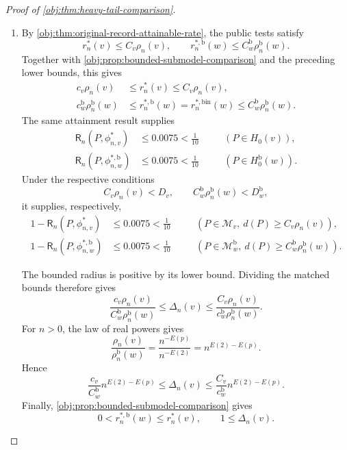 \documentclass[11pt]{article}
\begin{document}
\begin{proof}[Proof of \cref{obj:thm:heavy-tail-comparison}]
\begin{enumerate}
\item By \cref{obj:thm:original-record-attainable-rate}, the public tests satisfy
\[
r_n^*(v)\le C_v\rho_n(v),
\qquad
r_n^{*,\mathrm b}(w)\le C_w^{\mathrm b}\rho_n^{\mathrm b}(w).
\]
Together with \cref{obj:prop:bounded-submodel-comparison} and the preceding lower bounds, this gives
\[
\begin{aligned}
c_v\rho_n(v)
&\le r_n^*(v)\le C_v\rho_n(v),\\
c_w^{\mathrm b}\rho_n^{\mathrm b}(w)
&\le r_n^{*,\mathrm b}(w)
=r_n^{*,\mathrm{bin}}(w)
\le C_w^{\mathrm b}\rho_n^{\mathrm b}(w).
\end{aligned}
\]
The same attainment result supplies
\[
\begin{aligned}
\mathsf R_n(P,\phi^*_{n,v})&\le0.0075<\frac1{10}
&&\quad(P\in H_0(v)),\\
\mathsf R_n(P,\phi^{*,\mathrm b}_{n,w})&\le0.0075<\frac1{10}
&&\quad(P\in H_0^{\mathrm b}(w)).
\end{aligned}
\]
Under the respective conditions
\[
C_v\rho_n(v)<D_v,
\qquad
C_w^{\mathrm b}\rho_n^{\mathrm b}(w)<D_w^{\mathrm b},
\]
it supplies, respectively,
\[
\begin{aligned}
1-\mathsf R_n(P,\phi^*_{n,v})&\le0.0075<\frac1{10}
&&\quad(P\in\mathcal M_v,\ d(P)\ge C_v\rho_n(v)),\\
1-\mathsf R_n(P,\phi^{*,\mathrm b}_{n,w})&\le0.0075<\frac1{10}
&&\quad(P\in\mathcal M_w^{\mathrm b},\
d(P)\ge C_w^{\mathrm b}\rho_n^{\mathrm b}(w)).
\end{aligned}
\]

The bounded radius is positive by its lower bound. Dividing the matched bounds therefore gives
\[
\frac{c_v\rho_n(v)}
     {C_w^{\mathrm b}\rho_n^{\mathrm b}(w)}
\le\Delta_n(v)
\le
\frac{C_v\rho_n(v)}
     {c_w^{\mathrm b}\rho_n^{\mathrm b}(w)}.
\]
For \(n>0\), the law of real powers gives
\[
\frac{\rho_n(v)}{\rho_n^{\mathrm b}(w)}
=\frac{n^{-E(p)}}{n^{-E(2)}}
=n^{E(2)-E(p)}.
\]
Hence
\[
\frac{c_v}{C_w^{\mathrm b}}n^{E(2)-E(p)}
\le\Delta_n(v)
\le
\frac{C_v}{c_w^{\mathrm b}}n^{E(2)-E(p)}.
\]
Finally, \cref{obj:prop:bounded-submodel-comparison} gives
\[
0<r_n^{*,\mathrm b}(w)\le r_n^*(v),
\qquad
1\le\Delta_n(v).
\]


\end{enumerate}
\end{proof}
\end{document}
